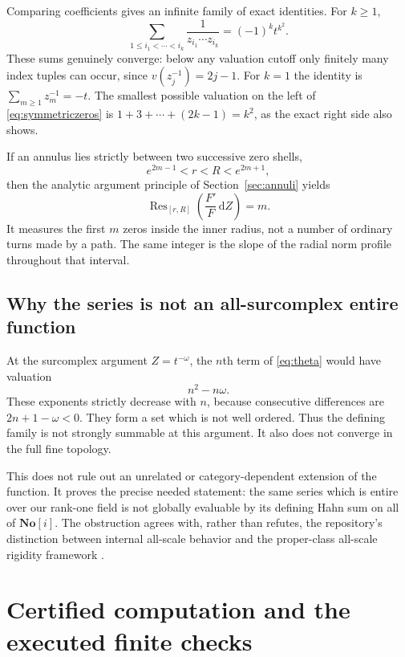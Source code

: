 \documentclass[11pt,a4paper]{article}
\numberwithin{equation}{section}
\theoremstyle{definition}
\theoremstyle{remark}
\newcommand{\No}{\mathbf{No}}
\newcommand{\Res}{\operatorname{Res}}
\newcommand{\dd}{\,\mathrm d}
\begin{document}
Comparing coefficients gives an infinite family of exact identities. For
$k\ge1$,
\begin{equation}\label{eq:symmetriczeros}
 \sum_{1\le i_1<\cdots<i_k}
   \frac1{z_{i_1}\cdots z_{i_k}}
       =(-1)^k t^{k^2}.
\end{equation}
These sums genuinely converge: below any valuation cutoff only finitely many
index tuples can occur, since $v(z_j^{-1})=2j-1$. For $k=1$ the identity is
$\sum_{m\ge1}z_m^{-1}=-t$. The smallest possible valuation on the left of
\eqref{eq:symmetriczeros} is $1+3+\cdots+(2k-1)=k^2$, as the exact right side
also shows.

If an annulus lies strictly between two successive zero shells,
\[
 e^{2m-1}<r<R<e^{2m+1},
\]
then the analytic argument principle of Section~\ref{sec:annuli} yields
\begin{equation}\label{eq:thetaargument}
 \Res_{[r,R]}\left(\frac{F'}F\dd Z\right)=m.
\end{equation}
It measures the first $m$ zeros inside the inner radius, not a number of
ordinary turns made by a path. The same integer is the slope of the radial norm
profile throughout that interval.

\subsection{Why the series is not an all-surcomplex entire function}
At the surcomplex argument $Z=t^{-\omega}$, the $n$th term of
\eqref{eq:theta} would have valuation
\[
 n^2-n\omega.
\]
These exponents strictly decrease with $n$, because consecutive differences are
$2n+1-\omega<0$. They form a set which is not well ordered. Thus the defining
family is not strongly summable at this argument. It also does not converge
in the full fine topology.

This does not rule out an unrelated or category-dependent extension of the
function. It proves the precise needed statement: the same series which is
entire over our rank-one field is not globally evaluable by its defining Hahn
sum on all of $\No[i]$. The obstruction agrees with, rather than refutes, the
repository's distinction between internal all-scale behavior and the
proper-class all-scale rigidity framework \cite{RepoFoundations}.

\section{Certified computation and the executed finite checks}
\label{sec:computation}
\end{document}
